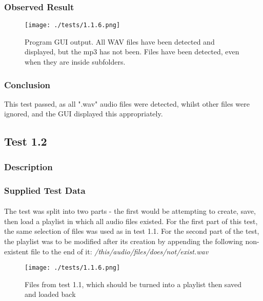 \subsubsection{Observed Result}
\label{sec:evidence1.1}
\begin{figure}[H]
	\texttt{[image: ./tests/1.1.6.png]}
	\caption{Program GUI output. All WAV files have been detected and displayed, but the mp3 has not been. Files have been detected, even when they are inside subfolders.}
\end{figure}

\subsubsection{Conclusion}
This test passed, as all ".wav" audio files were detected, whilst other files were ignored, and the GUI displayed this appropriately.


\pagebreak
\subsection{Test 1.2}
\subsubsection{Description}
\paragraph{}
{
	\centering
}

\subsubsection{Supplied Test Data}
\paragraph{}
The test was split into two parts - the first would be attempting to create, save, then load a playlist in which all audio files existed. For the first part of this test, the same selection of files was used as in test 1.1. For the second part of the test, the playlist was to be modified after its creation by appending the following non-existent file to the end of it:
\textit{/this/audio/files/does/not/exist.wav}
\begin{figure}[H]
	\texttt{[image: ./tests/1.1.6.png]}
	\caption{Files from test 1.1, which should be turned into a playlist then saved and loaded back}
\end{figure}

